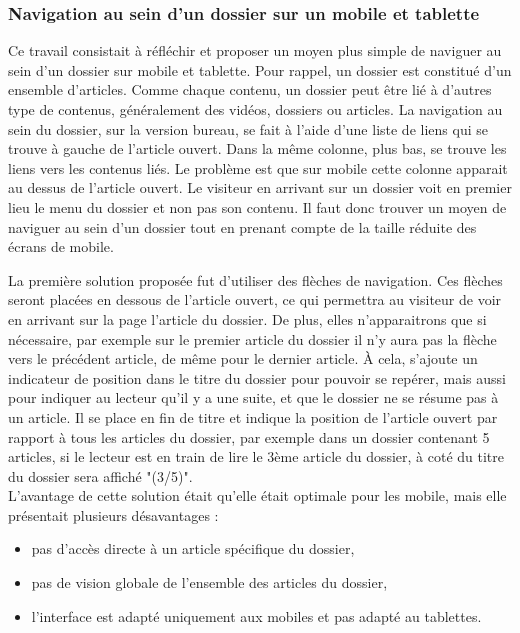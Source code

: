 \documentclass[12pt,a4paper]{article}
\begin{document}
\subsubsection{Navigation au sein d'un dossier sur un mobile et tablette}
Ce travail consistait à réfléchir et proposer un moyen plus simple de naviguer au sein d'un dossier sur mobile et tablette. Pour rappel, un dossier est constitué d'un ensemble d'articles. Comme chaque contenu, un dossier peut être lié à d'autres type de contenus, généralement des vidéos, dossiers ou articles. La navigation au sein du dossier, sur la version bureau, se fait à l'aide d'une liste de liens qui se trouve à gauche de l'article ouvert. Dans la même colonne, plus bas, se trouve les liens vers les contenus liés. Le problème est que sur mobile cette colonne apparait au dessus de l'article ouvert. Le visiteur en arrivant sur un dossier voit en premier lieu le menu du dossier et non pas son contenu. Il faut donc trouver un moyen de naviguer au sein d'un dossier tout en prenant compte de la taille réduite des écrans de mobile.\par
La première solution proposée fut d'utiliser des flèches de navigation. Ces flèches seront placées en dessous de l'article ouvert, ce qui permettra au visiteur de voir en arrivant sur la page l'article du dossier. De plus, elles n'apparaitrons que si nécessaire, par exemple sur le premier article du dossier il n'y aura pas la flèche vers le précédent article, de même pour le dernier article. À cela, s'ajoute un indicateur de position dans le titre du dossier pour pouvoir se repérer, mais aussi pour indiquer au lecteur qu'il y a une suite, et que le dossier ne se résume pas à un article. Il se place en fin de titre et indique la position de l'article ouvert par rapport à tous les articles du dossier, par exemple dans un dossier contenant 5 articles, si le lecteur est en train de lire le 3ème article du dossier, à coté du titre du dossier sera affiché "(3/5)".\\
L'avantage de cette solution était qu'elle était optimale pour les mobile, mais elle présentait plusieurs désavantages :
\begin{itemize}
\item pas d'accès directe à un article spécifique du dossier,
\item pas de vision globale de l'ensemble des articles du dossier,
\item l'interface est adapté uniquement aux mobiles et pas adapté au tablettes.
\end{itemize}\par
\end{document}
